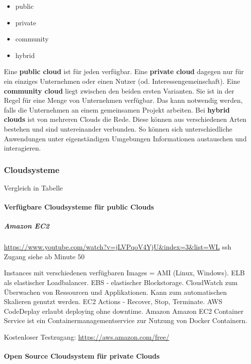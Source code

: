 \documentclass[a4paper,10pt]{article}
\begin{document}
\begin{itemize}
 \item public
 \item private
 \item community
 \item hybrid
\end{itemize}

Eine \textbf{public cloud} ist für jeden verfügbar.
Eine \textbf{private cloud} dagegen nur für ein einziges Unternehmen oder einen Nutzer (od. Interessengemeinschaft).
Eine \textbf{community cloud} liegt zwischen den beiden ersten Varianten. 
Sie ist in der Regel für eine Menge von Unternehmen verfügbar.
Das kann notwendig werden, falls die Unternehmen an einem gemeinsamen Projekt arbeiten.
Bei \textbf{hybrid clouds} ist von mehreren Clouds die Rede.
Diese können aus verschiedenen Arten bestehen und sind untereinander verbunden.
So können sich unterschiedliche Anwendungen unter eigenständigen Umgebungen Informationen austauschen und interagieren.

\subsubsection{Cloudsysteme}

Vergleich in Tabelle


\paragraph{Verfügbare Cloudsysteme für public Clouds}

\subparagraph{Amazon EC2}

\url{https://www.youtube.com/watch?v=jLVPqoV4YjU&index=3&list=WL}
ssh Zugang siehe ab Minute 50

Instances mit verschiedenen verfügbaren Images = AMI (Linux, Windows).
ELB als elastischer Loadbalancer.
EBS - elastischer Blockstorage.
CloudWatch zum Überwachen von Ressourcen und Applikationen.
Kann zum automatischen Skalieren genutzt werden.
EC2 Actions - Recover, Stop, Terminate.
AWS CodeDeplay erlaubt deploying ohne downtime.
Amazon
Amazon EC2 Container Service ist ein Containermanagementservice zur Nutzung von Docker Containern.

Kostenloser Testzugang: \url{https://aws.amazon.com/free/}

\paragraph{Open Source Cloudsystem für private Clouds}
\end{document}
